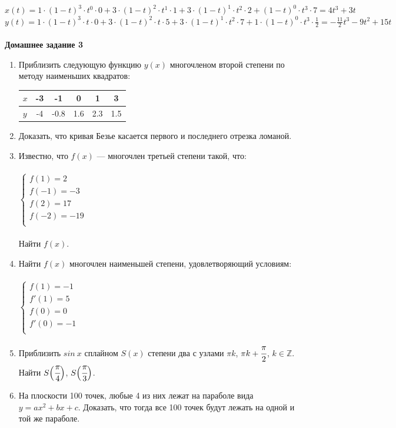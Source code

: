 \documentclass[12pt]{article}
\theoremstyle{definition}
\numberwithin{equation}{section}
\begin{document}
	$x(t) = 1\cdot (1-t)^3\cdot t^0\cdot 0+3\cdot (1-t)^2\cdot t^1\cdot 1+3\cdot (1-t)^1\cdot t^2\cdot 2+(1-t)^0\cdot t^3\cdot 7 = 4t^3+3t$\\
	$y(t) = 1\cdot (1-t)^3\cdot t\cdot 0+3\cdot (1-t)^2\cdot t\cdot 5+3\cdot (1-t)^1\cdot t^2\cdot 7+1\cdot (1-t)^0\cdot t^3\cdot \frac{1}{2} = - \frac{11}{2}t^3-9t^2+15t$\\ \\
	\noindent \textbf{Домашнее задание 3}
	\begin{enumerate}
		\item Приблизить следующую функцию $y(x)$ многочленом второй степени по методу наименьших квадратов:\\
		\begin{tabular}{|l|c|c|c|c|c|}
			\hline
			$x$ & -3 & -1 & 0 & 1 & 3 \\ \hline
			$y$ & -4 & -0.8 & 1.6 & 2.3 & 1.5\\ \hline
		\end{tabular}
		\item
		Доказать, что кривая Безье касается первого и последнего отрезка ломаной.
		\item
		Известно, что $f(x)$ --- многочлен третьей степени такой, что:\\ \\
		$
		\left\{
		\begin{array}{lcl}
		f(1) = 2 \\
		f(-1) = -3 \\
		f(2) = 17\\
		f(-2) = -19\\
		\end{array}
		\right.
		$\\
		\\Найти $f(x)$.
		\item
		Найти $f(x)$ многочлен наименьшей степени, удовлетворяющий условиям:\\ \\
		$
		\left\{
		\begin{array}{lcl}
		f(1) = -1 \\
		f'(1) = 5 \\
		f(0) = 0\\
		f'(0) = -1\\
		\end{array}
		\right.
		$
		\item
		Приблизить $sin~x$ сплайном $S(x)$ степени два с узлами $\pi k$, $\pi k + \cfrac{\pi}{2}$, $k\in \mathbb{Z}$. Найти $S \Big(\cfrac{\pi}{4} \Big)$, $S \Big(\cfrac{\pi}{3} \Big)$.
		\item На плоскости 100 точек, любые 4 из них лежат на параболе вида $y=ax^2+bx+c$. Доказать, что тогда все 100 точек будут лежать на одной и той же параболе.
	\end{enumerate}
\end{document}
